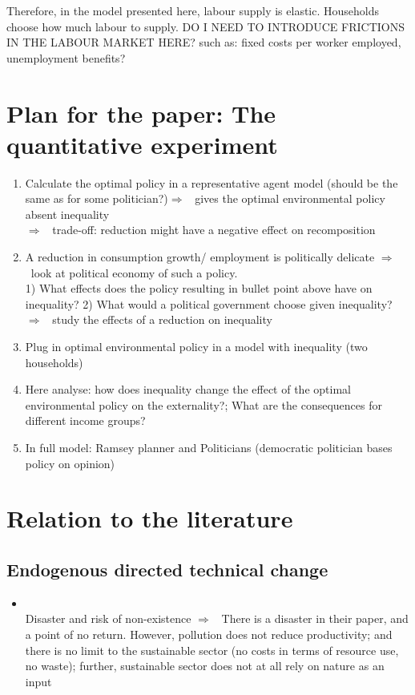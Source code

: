 \documentclass[12pt]{article}
\newcommand{\ar}{$\Rightarrow$ \ }
\begin{document}
Therefore, in the model presented here, labour supply is elastic. Households choose how much labour to supply. DO I NEED TO INTRODUCE FRICTIONS IN THE LABOUR MARKET HERE? such as: fixed costs per worker employed, unemployment benefits? 



\section{Plan for the paper: The quantitative experiment}
\begin{enumerate}
\item Calculate the optimal policy in a representative agent model (should be the same as for some politician?)\ar gives the optimal environmental policy absent inequality\\
\ar trade-off: reduction might have a negative effect on recomposition


\item A reduction in consumption growth/ employment is politically delicate \ar look at political economy of such a policy. \\
1) What effects does the policy resulting in bullet point above have on inequality?
2) What would a political government choose given inequality? 
\ar study the effects of a reduction on inequality

\item Plug in optimal environmental policy in a model with inequality (two households) 
\item Here analyse: how does inequality change the effect of the optimal environmental policy on the externality?; What are the consequences for different income groups?
\item In full model: Ramsey planner and Politicians (democratic politician bases policy on opinion) 
\end{enumerate}

\section{Relation to the literature}
\subsection{Endogenous directed technical change}
\begin{itemize}
	\item \cite{Acemoglu2012TheChange}\\
	Disaster and risk of non-existence \ar There is a disaster in their paper, and a point of no return. However, pollution does not reduce productivity; and there is no limit to the sustainable sector (no costs in terms of resource use, no waste); further, sustainable sector does not at all rely on nature as an input
\end{itemize} 
\end{document}
